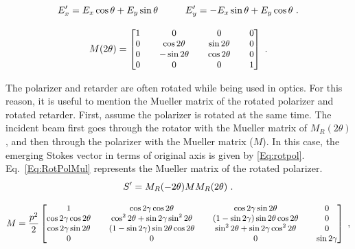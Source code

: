 \begin{description}
\begin{equation}
	\label{Eq:Rot}
\small
	E'_{x} = E_{x}\cos\theta + E_{y}\sin\theta \hspace{1 cm}
	E'_{y} = -E_{x}\sin\theta + E_{y}\cos\theta~. 
\end{equation}

\begin{equation}
\label{Eq:GenRotMul}
\small
	M(2\theta)= 
	\begin{bmatrix}
	1   & & 0  & & 0  & &0\\ 0   & &\cos 2\theta  & &\sin 2\theta  & &0\\0  & & -\sin 2\theta   & & \cos 2\theta  & & 0\\0  & &0  & & 0  & & 1\\
	\end{bmatrix}~.
\end{equation}

\end{description}
 

The polarizer and retarder are often rotated while being used in optics.
For this reason, it is useful to mention the Mueller matrix of the rotated polarizer and rotated retarder.
First, assume the polarizer is rotated at the same time.
The incident beam first goes through the rotator with the Mueller matrix of $M_{R}(2\theta)$, and then through the polarizer with the Mueller matrix ($M$).
In this case, the emerging Stokes vector in terms of original axis is given by \ref{Eq:rotpol}.
Eq.~\ref{Eq:RotPolMul} represents the Mueller matrix of the rotated polarizer.
\begin{equation}\label{Eq:rotpol}
\small
	S' = M_{R}(-2\theta)MM_{R}(2\theta)~.
\end{equation}

\begin{equation}\label{Eq:RotPolMul}
\small
	M = \frac{p^{2}}{2} 
	\begin{bmatrix}
	 1  & & \cos 2\gamma\cos 2\theta  & & \cos 2\gamma \sin 2\theta  & & 0\\ 
	 \cos 2\gamma\cos 2\theta   & & \cos^{2} 2\theta + \sin 2\gamma \sin^{2} 2\theta  & & (1-\sin 2\gamma)\sin 2\theta \cos 2\theta  & &  0\\
	 \cos 2\gamma \sin 2\theta   & & (1-\sin 2\gamma)\sin 2\theta \cos 2\theta  & & \sin^{2} 2\theta + \sin 2\gamma \cos^{2} 2\theta  & & 0\\
	 0  & & 0  & & 0  & & \sin 2\gamma\\
	\end{bmatrix}~,   
\end{equation}


